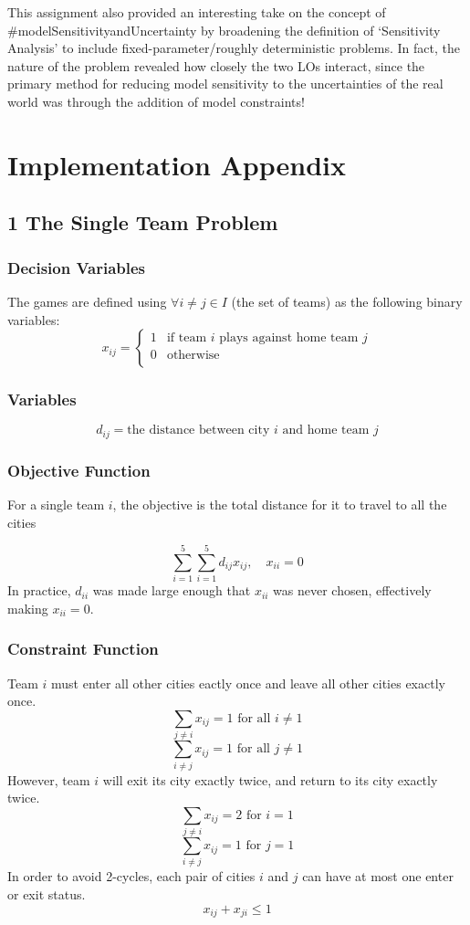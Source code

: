 \documentclass[twoside]{article}
\begin{document}
This assignment also provided an interesting take on the concept of \#modelSensitivityandUncertainty by broadening the definition of `Sensitivity Analysis' to include fixed-parameter/roughly deterministic problems. In fact, the nature of the problem revealed how closely the two LOs interact, since the primary method for reducing model sensitivity to the uncertainties of the real world was through the addition of model constraints!




\newpage
\twocolumn

\section*{Implementation Appendix}
\subsection*{1 The Single Team Problem}

\subsubsection*{Decision Variables}

The games are defined using $\forall i \neq j \in I$ (the set of teams) as the following binary variables:
$$ x_{ij} = 
\begin{cases} 
	1 & \textrm{if team $i$ plays against home team $j$} \\
	0 & \textrm{otherwise} \\
\end{cases}$$
\subsubsection*{Variables}
$$ d_{ij} = \textrm{the distance between city $i$ and home team $j$} $$
\subsubsection*{Objective Function}

For a single team $i$, the objective is the total distance for it to travel to all the cities 

$$\sum_{i=1}^5 \sum_{i=1}^5 d_{ij}x_{ij}, \quad x_{ii} =0 $$
In practice, $d_{ii}$ was made large enough that $x_{ii}$ was never chosen, effectively making $x_{ii} = 0$.
\subsubsection*{Constraint Function}
Team $i$ must enter all other cities eactly once and leave all other cities exactly once.
$$\sum_{j \neq i} x_{ij} = 1 \textrm{ for all } i \neq1$$ $$  \sum_{i \neq j} x_{ij} = 1 \textrm{ for all } j \neq 1  $$
However, team $i$ will exit its city exactly twice, and return to its city exactly twice.
$$\sum_{j \neq i} x_{ij} = 2 \textrm{ for } i  =1 $$ $$  \sum_{i \neq j} x_{ij} = 1 \textrm{ for } j = 1  $$
In order to avoid 2-cycles, each pair of cities $i$ and $j$ can have at most one enter or exit status.
$$ x_{ij} + x_{ji} \leq 1$$
\end{document}
